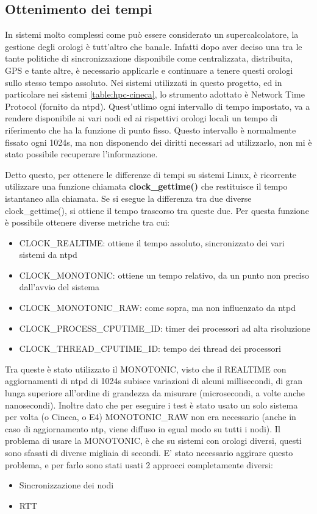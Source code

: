 \subsection{Ottenimento dei tempi}
In sistemi molto complessi come può essere considerato un supercalcolatore, la gestione degli orologi è tutt'altro che banale. Infatti dopo aver deciso una tra le tante politiche di sincronizzazione disponibile come centralizzata, distribuita, GPS e tante altre, è necessario applicarle e continuare a tenere questi orologi sullo stesso tempo assoluto. Nei sistemi utilizzati in questo progetto, ed in particolare nei sistemi \ref{table:hpc-cineca}, lo strumento adottato è Network Time Protocol (fornito da \gls{ntpd}). Quest'utlimo ogni intervallo di tempo impostato, va a rendere disponibile ai vari nodi ed ai rispettivi orologi locali un tempo di riferimento che ha la funzione di punto fisso. Questo intervallo è normalmente fissato ogni 1024s, ma non disponendo dei diritti necessari ad utilizzarlo, non mi è stato possibile recuperare l'informazione.

Detto questo, per ottenere le differenze di tempi su sistemi Linux, è ricorrente utilizzare una funzione chiamata \textbf{clock\_gettime()} che restituisce il tempo istantaneo alla chiamata. Se si esegue la differenza tra due diverse clock\_gettime(), si ottiene il tempo trascorso tra queste due.
Per questa funzione è possibile ottenere diverse metriche tra cui:
\begin{itemize}
    \item CLOCK\_REALTIME: ottiene il tempo assoluto, sincronizzato dei vari sistemi da ntpd
    \item CLOCK\_MONOTONIC: ottiene un tempo relativo, da un punto non preciso dall'avvio del sistema
    \item CLOCK\_MONOTONIC\_RAW: come sopra, ma non influenzato da ntpd
    \item CLOCK\_PROCESS\_CPUTIME\_ID: timer dei processori ad alta risoluzione
    \item CLOCK\_THREAD\_CPUTIME\_ID: tempo dei thread dei processori
\end{itemize}
Tra queste è stato utilizzato il MONOTONIC, visto che il REALTIME con aggiornamenti di ntpd di 1024s subisce variazioni di alcuni millisecondi\cite{ntpd}, di gran lunga superiore all'ordine di grandezza da misurare (microsecondi, a volte anche nanosecondi). Inoltre dato che per eseguire i test è stato usato un solo sistema per volta (o Cineca, o E4) MONOTONIC\_RAW non era necessario (anche in caso di aggiornamento ntp, viene diffuso in egual modo su tutti i nodi).
Il problema di usare la MONOTONIC, è che su sistemi con orologi diversi, questi sono sfasati di diverse migliaia di secondi. E' stato necessario aggirare questo problema, e per farlo sono stati usati 2 approcci completamente diversi:
\begin{itemize}
    \item Sincronizzazione dei nodi
    \item RTT
\end{itemize} 

